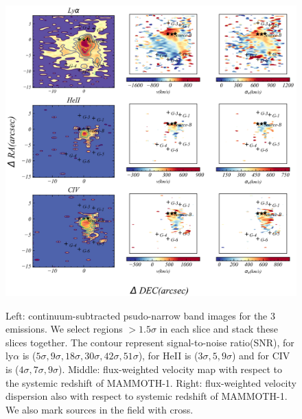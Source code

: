 \documentclass[../Results.tex]{subfiles}
\begin{document}
	 \begin{figure}[htp]
		\centering
		\includegraphics[width=\textwidth]{figs/emissionmap}
		\label{kinematicsmap}
		\caption{Left: continuum-subtracted psudo-narrow band images for the 3 emissions. We select regions $> 1.5\sigma$ in each slice and stack these slices together. The contour represent signal-to-noise ratio(SNR), for ly$\alpha$ is ($5\sigma,9\sigma,18\sigma,30\sigma,42\sigma,51\sigma$), for HeII is ($3\sigma,5,9\sigma$) and for CIV is ($4\sigma,7\sigma,9\sigma$). Middle: flux-weighted velocity map with respect to the systemic redshift of MAMMOTH-1. Right: flux-weighted velocity dispersion also with respect to systemic redshift of MAMMOTH-1. We also mark sources in the field with cross.}
	\end{figure}
	
\end{document}
